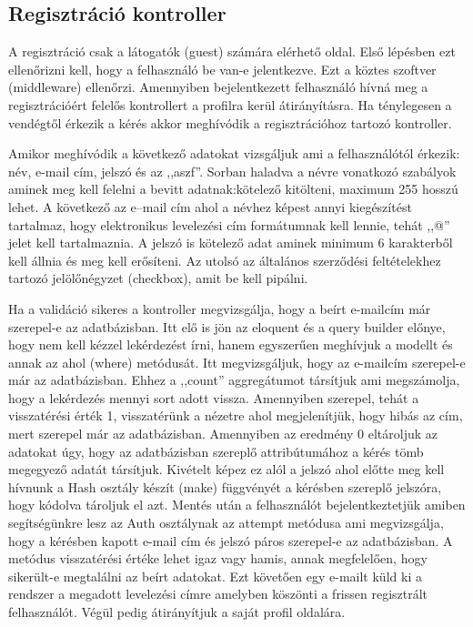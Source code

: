 \documentclass[
]{thesis-ekf}
\theoremstyle{definition}
\theoremstyle{remark}
\begin{document}
\subsection{Regisztráció kontroller}
A regisztráció csak a látogatók (guest) számára elérhető oldal. Első lépésben ezt ellenőrizni kell, hogy a felhasználó be van-e jelentkezve. Ezt a köztes szoftver (middleware) ellenőrzi. Amennyiben bejelentkezett felhasználó hívná meg a regisztrációért felelős kontrollert a profilra kerül átirányításra. Ha ténylegesen a vendégtől érkezik a kérés akkor meghívódik a regisztrációhoz tartozó kontroller.  

Amikor meghívódik a következő adatokat vizsgáljuk ami a felhasználótól érkezik: név, e-mail cím, jelszó és az ,,aszf''.
Sorban haladva a névre vonatkozó szabályok aminek meg kell felelni a bevitt adatnak:kötelező kitölteni, maximum 255 hosszú lehet. A következő az e--mail cím ahol a névhez képest annyi kiegészítést tartalmaz, hogy elektronikus levelezési cím formátumnak kell lennie, tehát ,,@'' jelet kell tartalmaznia.
A jelszó is kötelező adat aminek minimum 6 karakterből kell állnia és meg kell erősíteni. Az utolsó az általános szerződési feltételekhez tartozó jelölőnégyzet (checkbox), amit be kell pipálni.

Ha a validáció sikeres a kontroller megvizsgálja, hogy a beírt e-mailcím már szerepel-e az adatbázisban. Itt elő is jön az eloquent és a query builder előnye, hogy nem kell kézzel lekérdezést írni, hanem egyszerűen meghívjuk a modellt és annak az ahol (where) metódusát. Itt megvizsgáljuk, hogy az e-mailcím szerepel-e már az adatbázisban. Ehhez a ,,count'' aggregátumot társítjuk ami megszámolja, hogy a lekérdezés mennyi sort adott vissza. Amennyiben szerepel, tehát a visszatérési érték 1, visszatérünk a nézetre ahol megjelenítjük, hogy hibás az cím, mert szerepel már az adatbázisban. Amennyiben az eredmény 0 eltároljuk az adatokat úgy, hogy az adatbázisban szereplő attribútumához a kérés tömb megegyező adatát társítjuk. Kivételt képez ez alól a jelszó ahol előtte meg kell hívnunk a Hash osztály készít (make) függvényét a kérésben szereplő jelszóra, hogy kódolva tároljuk el azt. Mentés után a felhasználót bejelentkeztetjük amiben segítségünkre lesz az Auth osztálynak az attempt metódusa ami megvizsgálja, hogy a kérésben kapott e-mail cím és jelszó páros szerepel-e az adatbázisban. A metódus visszatérési értéke lehet igaz vagy hamis, annak megfelelően, hogy sikerült-e megtalálni az beírt adatokat. Ezt követően egy e-mailt küld ki a rendszer a megadott levelezési címre amelyben köszönti a frissen regisztrált felhasználót. Végül pedig átirányítjuk a saját profil oldalára.
\end{document}
